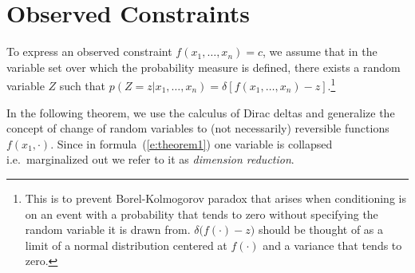 \documentclass[letterpaper]{article}
\newcommand{\pr}{p}
\begin{document}

\section{Observed Constraints}\label{sect:determinism}

To express an observed constraint $f(x_1, \ldots, x_n) = c$, we assume that
in the variable set over which the probability measure is defined, there exists 
a random variable $Z$ such that $\pr(Z=z | x_1, \ldots, x_n) = \delta[f(x_1, \ldots, x_n) - z]$.\footnote{
This is to prevent Borel-Kolmogorov paradox \cite{kolmogorov1950foundations}
that arises when conditioning is on an event with a probability that tends to zero 
without specifying the random variable it is drawn from. %
$\delta\big( f(\cdot) - z\big)$ should be thought of as a limit of a normal distribution centered at $f(\cdot)$ and a variance that tends to zero.
} 

In the following theorem, we use the calculus of Dirac deltas and generalize the concept of change of random variables to (not necessarily) reversible functions $f(x_1, \cdot)$.
Since in formula~(\ref{e:theorem1}) one variable is collapsed i.e.\ marginalized out we refer to it as \emph{dimension reduction}. 
\end{document}
